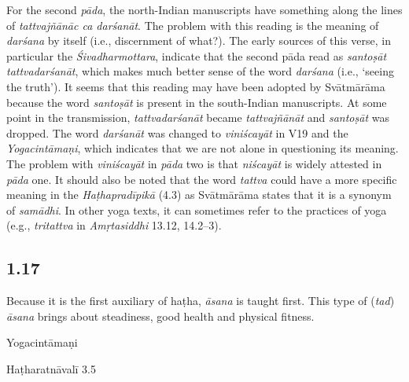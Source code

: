 \begin{ekdosis}
\begin{philcomm}[hp01_016]    
For the second \emph{pāda}, the north-Indian manuscripts have something along the lines of \emph{tattvajñānāc ca darśanāt}. The problem with this reading is the meaning of \emph{darśana} by itself (i.e., discernment of what?). The early sources of this verse, in particular the \emph{Śivadharmottara}, indicate that the second pāda read as \emph{santoṣāt tattvadarśanāt}, which makes much better sense of the word \emph{darśana} (i.e., ‘seeing the truth’). It seems that this reading may have been adopted by Svātmārāma because the word \emph{santoṣāt} is present in the south-Indian manuscripts. At some point in the transmission, \emph{tattvadarśanāt} became \emph{tattvajñānāt} and \emph{santoṣāt} was dropped. The word \emph{darśanāt} was changed to \emph{viniścayāt} in V19 and the \emph{Yogacintāmaṇi}, which indicates that we are not alone in questioning its meaning. The problem with \emph{viniścayāt} in \emph{pāda} two is that \emph{niścayāt} is widely attested in \emph{pāda} one. It should also be noted that the word \emph{tattva} could have a more specific meaning in the \emph{Haṭhapradīpikā} (4.3) as Svātmārāma states that it is a synonym of \emph{samādhi}. In other yoga texts, it can sometimes refer to the practices of yoga (e.g., \emph{tritattva} in \emph{Amṛtasiddhi} 13.12, 14.2--3). 
\end{philcomm}

\subsection*{1.17}
\begin{translation}[hp01_017]
Because it is the first auxiliary of haṭha, \emph{āsana} is taught first. This type of (\emph{tad}) \emph{āsana} brings about steadiness, good health and physical fitness.
\end{translation}

\begin{testimonia}[hp01_017]
Yogacintāmaṇi

\begin{versinnote}
\end{versinnote}

Haṭharatnāvalī 3.5

\begin{versinnote}
\end{versinnote}


\end{testimonia}
\end{ekdosis}
